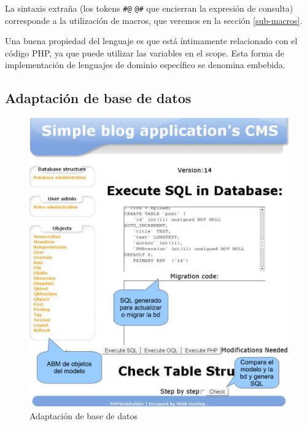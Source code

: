 La sintaxis extraña (los tokens \verb"#@" \verb"@#" que encierran la expresión de consulta) corresponde a la utilización de macros, que veremos en la sección \ref{sub-macros}.

Una buena propiedad del lenguaje es que está íntimamente relacionado con el código PHP, ya que puede utilizar las variables en el scope. Esta forma de implementación de lenguajes de dominio específico se denomina embebida.

\subsection{Adaptación de base de datos}
\label{sub-adapt}
\begin{figure}
	\centering
	\includegraphics[scale=0.5]{images/admin2.pdf}
 	\caption{Adaptación de base de datos}
 	\label{fig-admin1}
\end{figure}

